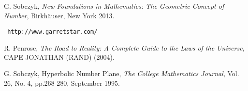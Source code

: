 \documentclass[]{article}
\begin{document}
         \begin{thebibliography}{}
 G. Sobczyk, {\em New Foundations in Mathematics: The Geometric Concept of Number},
\newblock Birkh\"auser, New York 2013.
\begin{verbatim} http://www.garretstar.com/ \end{verbatim}
 R. Penrose, {\em The Road to Reality: A Complete Guide to the Laws of the Universe}, CAPE JONATHAN (RAND) (2004). 


 G. Sobczyk, Hyperbolic Number Plane, {\it The College Mathematics
Journal}, Vol. 26, No. 4, pp.268-280, September 1995.


\end{thebibliography}
\end{document}
